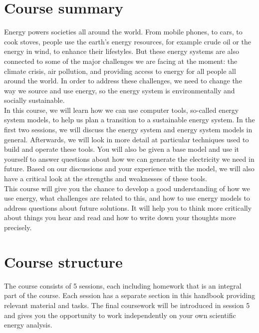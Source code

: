 



\section*{Course summary}

Energy powers societies all around the world. From mobile phones, to cars, to cook stoves, people use the earth's energy resources, for example crude oil or the energy in wind, to enhance their lifestyles. But these energy systems are also connected to some of the major challenges we are facing at the moment: the climate crisis, air pollution, and providing access to energy for all people all around the world. In order to address these challenges, we need to change the way we source and use energy, so the energy system is environmentally and socially sustainable.\\

In this course, we will learn how we can use computer tools, so-called energy system models, to help us plan a transition to a sustainable energy system. In the first two sessions, we will discuss the energy system and energy system models in general. Afterwards, we will look in more detail at particular techniques used to build and operate these tools. You will also be given a base model and use it yourself to answer questions about how we can generate the electricity we need in future. Based on our discussions and your experience with the model, we will also have a critical look at the strengths and weaknesses of these tools.\\

This course will give you the chance to develop a good understanding of how we use energy, what challenges are related to this, and how to use energy models to address questions about future solutions. It will help you to think more critically about things you hear and read and how to write down your thoughts more precisely.\\

\section*{Course structure}

The course consists of 5 sessions, each including homework that is an integral part of the course. Each session has a separate section in this handbook providing relevant material and tasks. The final coursework will be introduced in session 5 and gives you the opportunity to work independently on your own scientific energy analysis.